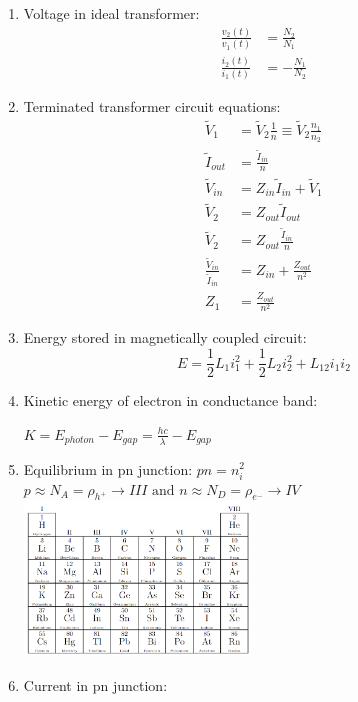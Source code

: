 \documentclass[twocolumn]{article}
\begin{document}
\begin{enumerate}
\begin{center}
    \end{center}
    \item Voltage in ideal transformer: 
    \begin{align*}
        \frac{v_2(t)}{v_1(t)} &= \frac{N_2}{N_1} \\
        \frac{i_2(t)}{i_1(t)} &= -\frac{N_1}{N_2}   
    \end{align*}
    \item Terminated transformer circuit equations: 
    \begin{align*}
        \tilde{V}_1 &= \tilde{V}_2\frac{1}{n}\equiv\tilde{V}_2\frac{n_1}{n_2}  \\
        \tilde{I}_{out} &= \frac{\tilde{I}_{in}}{n} \\
        \tilde{V}_{in} &= Z_{in}\tilde{I}_{in} + \tilde{V}_1 \\
        \tilde{V}_2 &= Z_{out}\tilde{I}_{out} \\
        \tilde{V}_2 &= Z_{out}\frac{\tilde{I}_{in}}{n} \\
        \frac{\tilde{V}_{in}}{\tilde{I}_{in}} &= Z_{in} + \frac{Z_{out}}{n^2}\\
        Z_{1}&=\frac{Z_{out}}{n^2}
    \end{align*}
    \item Energy stored in magnetically coupled circuit: 
    \[E = \frac{1}{2}L_1i_1^2 + \frac{1}{2}L_2i_2^2 + L_{12}i_1i_2\]
    \newpage
    \item Kinetic energy of electron in conductance band:
    \begin{center}
    $K=E_{photon}-E_{gap}=\frac{hc}{\lambda}-E_{gap}$
    \end{center}
    \item Equilibrium in pn junction: $pn = n_i^2$\\ \hspace{1cm}$p\approx N_A = \rho_{h^+}\rightarrow III \text{ and } n\approx N_D = \rho_{e^-} \rightarrow IV$
    \includegraphics[width=6cm]{images/periodic_table.png}
    \item Current in pn junction: 
    \begin{align*}

\end{align*}
\end{enumerate}
\end{document}
